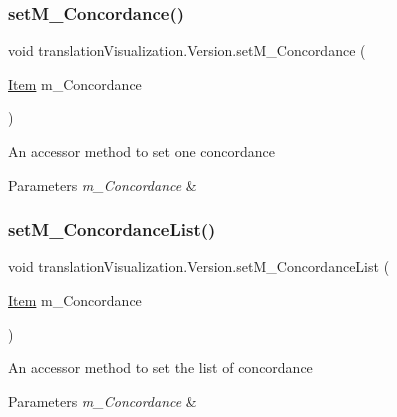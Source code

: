 \subsubsection{\texorpdfstring{set\+M\+\_\+\+Concordance()}{setM\_Concordance()}}
{\footnotesize\ttfamily void translation\+Visualization.\+Version.\+set\+M\+\_\+\+Concordance (\begin{DoxyParamCaption}\item[{\hyperlink{classtranslation_visualization_1_1_item}{Item}}]{m\+\_\+\+Concordance }\end{DoxyParamCaption})\hspace{0.3cm}{\ttfamily [inline]}}

An accessor method to set one concordance 
\begin{DoxyParams}{Parameters}
{\em m\+\_\+\+Concordance} & \\
\hline
\end{DoxyParams}
\mbox{\label{classtranslation_visualization_1_1_version_a5a59a5e66eed9a1087c7a40d8f1f3e9f}} 
\subsubsection{\texorpdfstring{set\+M\+\_\+\+Concordance\+List()}{setM\_ConcordanceList()}}
{\footnotesize\ttfamily void translation\+Visualization.\+Version.\+set\+M\+\_\+\+Concordance\+List (\begin{DoxyParamCaption}\item[{\hyperlink{classtranslation_visualization_1_1_item}{Item}}]{m\+\_\+\+Concordance }\end{DoxyParamCaption})\hspace{0.3cm}{\ttfamily [inline]}}

An accessor method to set the list of concordance 
\begin{DoxyParams}{Parameters}
{\em m\+\_\+\+Concordance} & \\
\hline
\end{DoxyParams}
\mbox{\label{classtranslation_visualization_1_1_version_a90f774c31c131b82dcb57ad1f73d1456}} 
